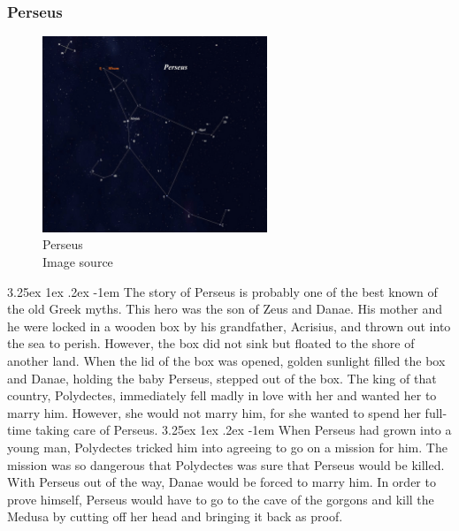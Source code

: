 \documentclass[a4paper,twoside,11pt]{article}
\makeatletter
\numberwithin{equation}{section}
\renewcommand\paragraph{\@startsection{paragraph}{5}{\z@}%
  {3.25ex \@plus1ex \@minus.2ex}%
  {-1em}%
  {\normalfont\normalsize\bfseries}}
\makeatother
\begin{document}
\subsubsection{Perseus}
\begin{figure}[h]
\centering
\includegraphics[width=0.6\textwidth]{fig17.jpg}
\caption{Perseus \\ Image source \cite{Persi}}
\label{fig17}
\end{figure}
\paragraph{}
The story of Perseus is probably one of the best known of the old Greek myths. This hero was the son of Zeus and Danae. His mother and he were locked in a wooden box by his grandfather, Acrisius, and thrown out into the sea to perish. However, the box did not sink but floated to the shore of another land. When the lid of the box was opened, golden sunlight filled the box and Danae, holding the baby Perseus, stepped out of the box. The king of that country, Polydectes, immediately fell madly in love with her and wanted her to marry him. However, she would not marry him, for she wanted to spend her full-time taking care of Perseus.
\paragraph{}
When Perseus had grown into a young man, Polydectes tricked him into agreeing to go on a mission for him. The mission was so dangerous that Polydectes was sure that Perseus would be killed. With Perseus out of the way, Danae would be forced to marry him. In order to prove himself, Perseus would have to go to the cave of the gorgons and kill the Medusa by cutting off her head and bringing it back as proof.
\end{document}
